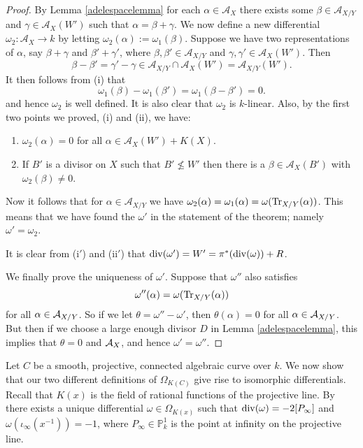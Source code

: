 \begin{proof}
    By Lemma \ref{adelespacelemma} for each $\alpha \in \mathcal{A}_X$ there exists some $\beta \in \mathcal{A}_{X/Y}$ and $\gamma \in \mathcal{A}_X(W')$ such that $\alpha = \beta + \gamma$.
    We now define a new differential $\omega_2 \colon  \mathcal{A}_X \rightarrow k$ by letting $\omega_2(\alpha) := \omega_1(\beta)$.
    Suppose we have two representations of $\alpha$, say $\beta+ \gamma$ and $\beta' + \gamma'$, where $\beta, \beta' \in \mathcal{A}_{X/Y}$ and $\gamma, \gamma' \in \mathcal{A}_{X}(W')$.
    Then 
        \[
        \beta - \beta' = \gamma' - \gamma \in \mathcal{A}_{X/Y} \cap \mathcal{A}_X(W') = \mathcal{A}_{X/Y}(W').
        \]
    It then follows from (i) that 
        \[
        \omega_1(\beta) - \omega_1(\beta') = \omega_1(\beta - \beta') = 0.
        \]
    and hence $\omega_2$ is well defined.
    It is also clear that $\omega_2$ is $k$-linear.
    Also, by the first two points we proved, (i) and (ii), we have:
        \begin{enumerate}[(i$'$)]
        \item $\omega_2(\alpha) = 0$ for all $\alpha \in \mathcal{A}_X(W') + K(X)$.
        \item If $B'$ is a divisor on $X$ such that $B'\nleq W'$ then there is a $\beta \in \mathcal{A}_X(B')$ with $\omega_2(\beta) \neq 0$.
        \end{enumerate}
    
    
    Now it follows that for $\alpha \in \mathcal{A}_{X/Y}$ we have $\omega_2(\alpha) = \omega_1(\alpha) = \omega(\operatorname{Tr}_{X/Y}(\alpha))$.
    This means that we have found the $\omega'$ in the statement of the theorem; namely $\omega' = \omega_2$.
    
    It is clear from (i$'$) and (ii$'$) that $\operatorname{div}(\omega') = W' = \pi^*(\operatorname{div}(\omega)) + R$.
    
    We finally prove the uniqueness of $\omega'$.
    Suppose that $\omega''$ also satisfies 
        \[
        \omega''(\alpha) = \omega(\operatorname{Tr}_{X/Y}(\alpha))
        \]
    for all $\alpha\in {\mathcal A}_{X/Y}$.
    So if we let $\theta = \omega'' - \omega'$, then $\theta(\alpha) = 0$ for all $\alpha \in {\mathcal A}_{X/Y}$.
    But then if we choose a large enough divisor $D$ in Lemma \ref{adelespacelemma}, this implies that $\theta = 0$ and ${\mathcal A}_X$, and hence $\omega' = \omega''$.
    \end{proof}





Let $C$ be a smooth, projective, connected algebraic curve over $k$.
We now show that our two different definitions of $\Omega_{K(C)}$ give rise to isomorphic differentials.
Recall that $K(x)$ is the field of rational functions of the projective line.
By \cite[Prop. 1.7.4]{stichtenoth} there exists a unique differential $\omega \in \Omega_{K(x)}$ such that $\operatorname{div} (\omega) = -2[P_{\infty}]$ and $\omega(\iota_\infty(x^{-1})) = -1$, where $P_\infty \in \mathbb P_k^1$ is the point at infinity on the projective line.


